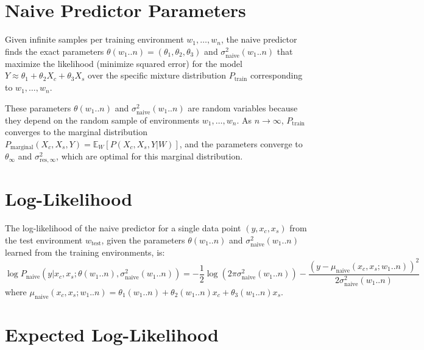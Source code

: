 \documentclass{article}
\begin{document}
\section{Naive Predictor Parameters}

Given infinite samples per training environment $w_1, \dots, w_n$, the naive predictor finds the exact parameters $\theta(w_1..n) = (\theta_1, \theta_2, \theta_3)$ and $\sigma_{\text{naive}}^2(w_1..n)$ that maximize the likelihood (minimize squared error) for the model $Y \approx \theta_1 + \theta_2 X_c + \theta_3 X_s$ over the specific mixture distribution $P_{\text{train}}$ corresponding to $w_1, \dots, w_n$.

These parameters $\theta(w_1..n)$ and $\sigma_{\text{naive}}^2(w_1..n)$ are random variables because they depend on the random sample of environments $w_1, \dots, w_n$. As $n \to \infty$, $P_{\text{train}}$ converges to the marginal distribution $P_{\text{marginal}}(X_c, X_s, Y) = \mathbb{E}_{W}[P(X_c, X_s, Y | W)]$, and the parameters converge to $\theta_\infty$ and $\sigma_{\text{res},\infty}^2$, which are optimal for this marginal distribution.

\section{Log-Likelihood}

The log-likelihood of the naive predictor for a single data point $(y, x_c, x_s)$ from the test environment $w_{\text{test}}$, given the parameters $\theta(w_1..n)$ and $\sigma_{\text{naive}}^2(w_1..n)$ learned from the training environments, is:
\begin{equation}
\log P_{\text{naive}}(y | x_c, x_s; \theta(w_1..n), \sigma_{\text{naive}}^2(w_1..n)) = -\frac{1}{2} \log(2\pi \sigma_{\text{naive}}^2(w_1..n)) - \frac{(y - \mu_{\text{naive}}(x_c, x_s; w_1..n))^2}{2 \sigma_{\text{naive}}^2(w_1..n)}
\end{equation}
where $\mu_{\text{naive}}(x_c, x_s; w_1..n) = \theta_1(w_1..n) + \theta_2(w_1..n)x_c + \theta_3(w_1..n)x_s$.

\section{Expected Log-Likelihood}
\end{document}
